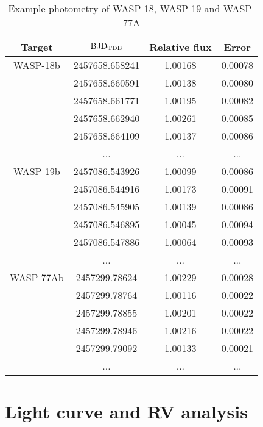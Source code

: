 \begin{table}

\caption{Example photometry of WASP-18, WASP-19 and WASP-77A}
\label{examplephot}
\centering
\begin{tabular}{c c c c}
\hline \hline
Target & ${\rm BJD_{TDB}}$\footnotemark{a} & Relative flux & Error\\
\hline
    WASP-18b &  2457658.658241   & 1.00168 & 0.00078 \\
             &  2457658.660591   & 1.00138 & 0.00080 \\
             &  2457658.661771   & 1.00195 & 0.00082 \\
             &  2457658.662940   & 1.00261 & 0.00085 \\
             &  2457658.664109   & 1.00137 & 0.00086 \\\smallskip
      & ...           & ...         &    ... \\
    WASP-19b & 2457086.543926   & 1.00099 & 0.00086  \\
             & 2457086.544916   & 1.00173 & 0.00091  \\
             & 2457086.545905   & 1.00139 & 0.00086  \\
             & 2457086.546895   & 1.00045 & 0.00094  \\
             & 2457086.547886   & 1.00064 & 0.00093  \\\smallskip
     &  ...           & ...         &    ...  \\
WASP-77Ab & 2457299.78624 & 1.00229 & 0.00028 \\ 
         & 2457299.78764 & 1.00116 & 0.00022 \\
         & 2457299.78855 & 1.00201 & 0.00022 \\
         & 2457299.78946 & 1.00216 & 0.00022 \\
         & 2457299.79092 & 1.00133 & 0.00021 \\
         & ...           & ...         &    ... \\    
\hline
\end{tabular}
\end{table}

\section{Light curve and RV analysis}

